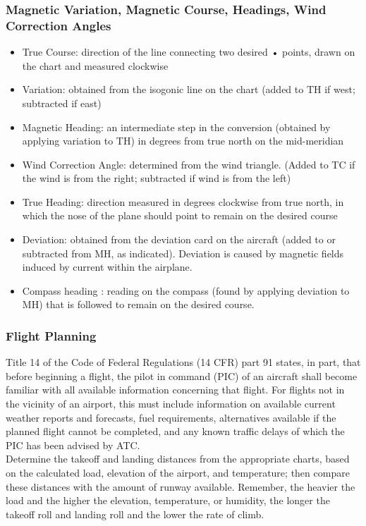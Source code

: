 \documentclass[12pt]{article}
\begin{document}
		\subsubsection{Magnetic Variation, Magnetic Course, Headings, Wind Correction Angles}
			\begin{itemize}
				\item True Course: direction of the line connecting two desired • points, drawn on the chart and measured clockwise
				\item Variation: obtained from the isogonic line on the chart (added to TH if west; subtracted if east)
				\item Magnetic Heading: an intermediate step in the conversion (obtained by applying variation to TH) in degrees from true north on the mid-meridian
				\item Wind Correction Angle: determined from the wind triangle. (Added to TC if the wind is from the right; subtracted if wind is from the left)
				\item True Heading: direction measured in degrees clockwise from true north, in which the nose of the plane should point to remain on the desired course
				\item Deviation: obtained from the deviation card on the aircraft (added to or subtracted from MH, as indicated). Deviation is caused by magnetic fields induced by current within the airplane.
				\item Compass heading : reading on the compass (found by applying deviation to MH) that is followed to remain on the desired course.
			\end{itemize}
		\subsubsection{Flight Planning}
			Title 14 of the Code of Federal Regulations (14 CFR) part 91 states, in part, that before beginning a flight, the pilot in command (PIC) of an aircraft shall become familiar with all available information concerning that flight. For flights not in the vicinity of an airport, this must include information on available current weather reports and forecasts, fuel requirements, alternatives available if the planned flight cannot be completed, and any known traffic delays of which the PIC has been advised by ATC.\\

			Determine the takeoff and landing distances from the appropriate charts, based on the calculated load, elevation of the airport, and temperature; then compare these distances with the amount of runway available. Remember, the heavier the load and the higher the elevation, temperature, or humidity, the longer the takeoff roll and landing roll and the lower the rate of climb.\\
\end{document}
